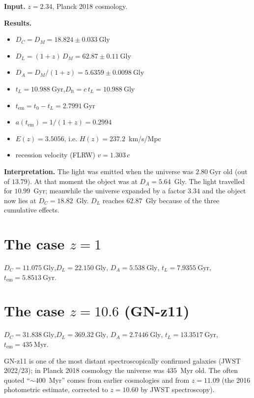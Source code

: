 \documentclass[11pt,a4paper,openany]{report}
\newcommand{\Gyr}{\text{Gyr}}
\newcommand{\Gly}{\text{Gly}}
\begin{document}
\begin{tcolorbox}[numeric]
\textbf{Input.} $z=2.34$, Planck 2018 cosmology.

\medskip
\noindent\textbf{Results.}
\begin{itemize}[topsep=2pt]
  \item $D_{C} = D_{M} = \num{18.824} \pm \num{0.033}~\Gly$
  \item $D_{L} = (1+z)\,D_{M} = \num{62.87} \pm \num{0.11}~\Gly$
  \item $D_{A} = D_{M}/(1+z) = \num{5.6359} \pm \num{0.0098}~\Gly$
  \item $t_{L} = \num{10.988}~\Gyr$,\quad $D_{\text{lt}} = c\,t_{L} = \num{10.988}~\Gly$
  \item $t_{\text{em}} = t_{0} - t_{L} = \num{2.7991}~\Gyr$
  \item $a(t_{\text{em}}) = 1/(1+z) = \num{0.2994}$
  \item $E(z) = 3.5056$, i.e. $H(z) = 237.2$~km/s/Mpc
  \item recession velocity (FLRW) $v = 1.303\,c$
\end{itemize}

\medskip
\noindent\textbf{Interpretation.} The light was emitted when the universe was
$2.80~\Gyr$ old (out of $13.79$). At that moment the object was at
$D_{A}=5.64$~Gly. The light travelled for $10.99$~Gyr; meanwhile the universe
expanded by a factor $3.34$ and the object now lies at $D_{C}=18.82$~Gly.
$D_{L}$ reaches $62.87$~Gly because of the three cumulative effects.
\end{tcolorbox}

\section{The case \texorpdfstring{$z=1$}{z=1}}

\begin{tcolorbox}[numeric]
$D_{C} = \num{11.075}~\Gly$,\quad $D_{L} = \num{22.150}~\Gly$,\quad
$D_{A} = \num{5.538}~\Gly$,\quad
$t_{L} = \num{7.9355}~\Gyr$,\quad $t_{\text{em}} = \num{5.8513}~\Gyr$.
\end{tcolorbox}

\section{The case \texorpdfstring{$z=10.6$}{z=10.6} (GN-z11)}

\begin{tcolorbox}[numeric]
$D_{C} = \num{31.838}~\Gly$,\quad $D_{L} = \num{369.32}~\Gly$,\quad
$D_{A} = \num{2.7446}~\Gly$,\quad
$t_{L} = \num{13.3517}~\Gyr$,\quad $t_{\text{em}} = \num{435}~\text{Myr}$.

\medskip
GN-z11 is one of the most distant spectroscopically confirmed galaxies (JWST
2022/23); in Planck 2018 cosmology the universe was $435$~Myr old. The often
quoted “$\sim 400$~Myr” comes from earlier cosmologies and from $z = 11.09$
(the 2016 photometric estimate, corrected to $z = 10.60$ by JWST spectroscopy).
\end{tcolorbox}
\end{document}
